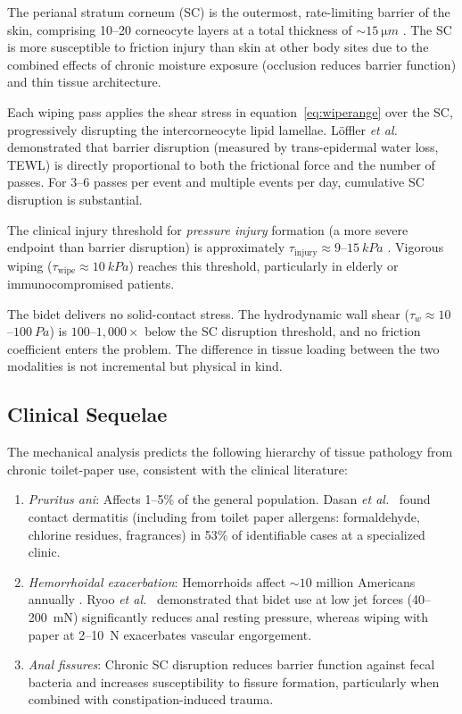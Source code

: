 \documentclass[aps,prfluids,reprint,amsmath,amssymb,floatfix]{revtex4-2}
\begin{document}
The perianal stratum corneum (SC) is the outermost, rate-limiting barrier
of the skin, comprising 10--20 corneocyte layers at a total thickness of
$\sim\SI{15}{\micro m}$ \citep{Loden2012}. The SC is more susceptible to
friction injury than skin at other body sites due to the combined effects
of chronic moisture exposure (occlusion reduces barrier function) and thin
tissue architecture.

Each wiping pass applies the shear stress in equation~\eqref{eq:wiperange}
over the SC, progressively disrupting the intercorneocyte lipid lamellae.
L\"offler \textit{et al.}\ \citep{Loffler2004} demonstrated that barrier
disruption (measured by trans-epidermal water loss, TEWL) is directly
proportional to both the frictional force and the number of passes.
For 3--6 passes per event and multiple events per day, cumulative SC
disruption is substantial.

The clinical injury threshold for \emph{pressure injury} formation (a more
severe endpoint than barrier disruption) is approximately
$\tau_\mathrm{injury} \approx 9$--$\SI{15}{kPa}$ \citep{Broderick2021}.
Vigorous wiping ($\tau_\mathrm{wipe} \approx \SI{10}{kPa}$) reaches this
threshold, particularly in elderly or immunocompromised patients.

The bidet delivers no solid-contact stress. The hydrodynamic wall shear
($\tau_w \approx 10$--$\SI{100}{Pa}$) is $100$--$1{,}000\times$ below the
SC disruption threshold, and no friction coefficient enters the problem.
The difference in tissue loading between the two modalities is not
incremental but physical in kind.

\subsection{Clinical Sequelae}
\label{subsec:clinical}

The mechanical analysis predicts the following hierarchy of tissue pathology
from chronic toilet-paper use, consistent with the clinical literature:

\begin{enumerate}[leftmargin=*]
    \item \emph{Pruritus ani}: Affects 1--5\% of the general population.
    Dasan \textit{et al.}\ \citep{Dasan1999} found contact dermatitis (including
    from toilet paper allergens: formaldehyde, chlorine residues, fragrances)
    in 53\% of identifiable cases at a specialized clinic.
    \item \emph{Hemorrhoidal exacerbation}: Hemorrhoids affect $\sim10$ million
    Americans annually \citep{Peery2014}. Ryoo \textit{et al.}\ \citep{Ryoo2011}
    demonstrated that bidet use at low jet forces (40--\SI{200}{mN}) significantly
    reduces anal resting pressure, whereas wiping with paper at 2--\SI{10}{N}
    exacerbates vascular engorgement.
    \item \emph{Anal fissures}: Chronic SC disruption reduces barrier function
    against fecal bacteria and increases susceptibility to fissure formation,
    particularly when combined with constipation-induced trauma.
\end{enumerate}
\end{document}

